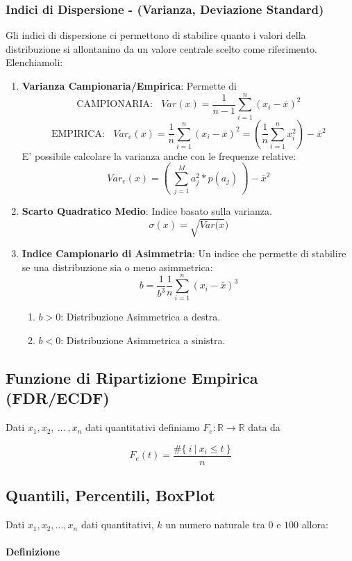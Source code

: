 \documentclass{article}
\begin{document}
\newpage

\subsubsection{Indici di Dispersione - (Varianza, Deviazione Standard)}

Gli indici di dispersione ci permettono di stabilire quanto i valori della distribuzione si allontanino da un valore centrale scelto come riferimento.
Elenchiamoli:

\begin{enumerate}
    \item \textbf{Varianza Campionaria/Empirica}: Permette di 
    \[ \text{CAMPIONARIA:} \:\:\:\: Var(x) = \frac{1}{n-1} \sum^{n}_{i=1}(x_{i}-\overline{x})^{2} \]
    \[ \text{EMPIRICA:} \:\:\:\: Var_{e}(x) = \frac{1}{n} \sum^{n}_{i=1}(x_{i}-\overline{x})^{2} = (\frac{1}{n}\sum^{n}_{i=1}x^{2}_{i}) - \overline{x}^{2}\]
    \vspace*{5px}
    E' possibile calcolare la varianza anche con le frequenze relative:
    \[ Var_{e}(x) = (\:\sum_{j=1}^{M}a^{2}_{j} * p(a_{j})\:) - \overline{x}^{2}\]
    \item \textbf{Scarto Quadratico Medio}: Indice basato sulla varianza.
    \[ \sigma(x) = \sqrt{Var(x}) \]
    \item \textbf{Indice Campionario di Asimmetria}: Un indice che permette di stabilire se una distribuzione sia o meno asimmetrica:
    \[ b = \frac{1}{b^{3}}\frac{1}{n}\sum_{i=1}^{n}(x_{i}-\overline{x})^{3} \]
    \begin{enumerate}
        \item $b>0$: Distribuzione Asimmetrica a destra.
        \item $b<0$: Distribuzione Asimmetrica a sinistra.
    \end{enumerate}
\end{enumerate}

\subsection{Funzione di Ripartizione Empirica (FDR/ECDF)}

Dati $x_{1}, x_{2}, \: ... \:, x_{n}$ dati quantitativi definiamo $F_{e}:\mathbb{R} \xrightarrow{} \mathbb{R}$ data da

\vspace*{10px}

\[ \boxed{F_{e}(t) = \frac{\#\{ \: i \: | \:x_{i} \leq t \: \}}{n}} \]

\vspace*{5px}

\subsection{Quantili, Percentili, BoxPlot}

Dati $x_{1}, x_{2}, ... , x_{n}$ dati quantitativi, $k$ un numero naturale tra $0$ e $100$ allora:

\paragraph{Definizione} 

\newpage
\end{document}
